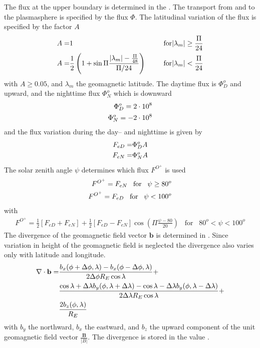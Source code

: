 %
The flux at the upper boundary is determined in the . The transport from and to the plasmasphere is
specified by the flux $\Phi$. The latitudinal variation of the flux
is specified by the factor $A$
%
\begin{align}
  A = & 1 & \;\;\; \text{for} & |\lambda_m| \geq \frac{\Pi}{24} \notag \\
  A = & \frac{1}{2} \left( 1 + \sin{ \Pi \frac{|\lambda_m| -
 \frac{\Pi}{48}}{\Pi/24}} \right) \;\;\; & \text{for} & |\lambda_m| <
\frac{\Pi}{24}
\end{align}
%
with $A \geq 0.05$, and $\lambda_m$ the geomagnetic latitude. 
The daytime flux is $\Phi_D^o$ and upward, and
the nighttime flux $\Phi_N^o$ which is downward
%
\begin{align}
 \Phi_D^o = 2 \cdot 10^8 \notag \\
 \Phi_N^o = - 2 \cdot 10^8
\end{align}
%
and the flux variation during the day-- and nighttime is given by
%
\begin{align}
 F_{eD} = & \Phi_D^o A \notag \\
 F_{eN} = & \Phi_N^o A
 \end{align}
%
The solar zenith angle $\psi$ determines which flux $F^{O^+}$ is
used
%
\begin{align}
  F^{O^+} = F_{eN} \;\;\; \text{for} \; \; \; \psi \geq 80^o \notag \\
  F^{O^+} = F_{eD} \;\;\; \text{for} \; \; \; \psi < 100^o \label{eq:oplus_flux1}
\end{align}
%
with
%
\begin{align}
  F^{O^+} = \frac{1}{2} [F_{eD} + F_{eN}] + \frac{1}{2} [F_{eD} -
  F_{eN}]\cos (\Pi \frac{\psi-80}{20})\;\;\; \text{for} \; \; \; 80^o < \psi < 100^o \label{eq:oplus_flux2}
\end{align}
%
The divergence of the geomagnetic field vector $\mathbf{b}$ is
determined in . Since variation in height of
the geomagnetic field is neglected the divergence also varies only
with latitude and longitude.
%
\begin{align}
 \nabla \cdot \mathbf{b} = &  \frac{b_x (\phi + \Delta \phi, \lambda) -
     b_x(\phi - \Delta \phi, \lambda)}{2 \Delta \phi R_E \cos
     \lambda} + \notag \\
     {} & \frac{\cos{\lambda+\Delta \lambda}b_y (\phi, \lambda+ \Delta \lambda) -
     \cos{\lambda-\Delta \lambda}b_y(\phi, \lambda- \Delta \lambda)}{2 \Delta \lambda R_E \cos
     \lambda} + \notag \\
     {} & \frac{2 b_z(\phi,\lambda)}{R_E}
\end{align}
%
with $b_y$ the northward, $b_x$ the eastward, and $b_z$ the upward
component of the unit geomagnetic field vector
$\frac{\mathbf{B}}{|B|}$. The divergence is stored in the value .\\

